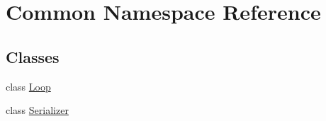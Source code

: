 \hypertarget{namespace_common}{}\section{Common Namespace Reference}
\label{namespace_common}
\subsection*{Classes}
\begin{DoxyCompactItemize}
\item 
class \hyperlink{class_common_1_1_loop}{Loop}
\item 
class \hyperlink{class_common_1_1_serializer}{Serializer}
\end{DoxyCompactItemize}
